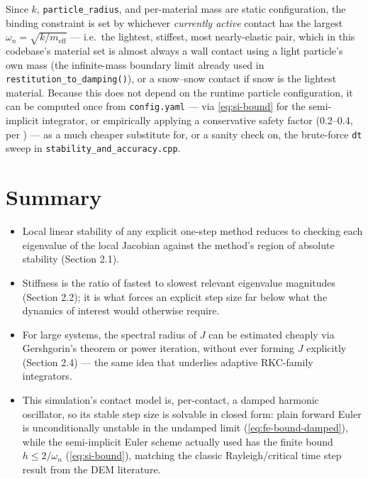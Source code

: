 \documentclass[11pt]{article}
\begin{document}
Since $k$, \texttt{particle\_radius}, and per-material mass are static configuration, the
binding constraint is set by whichever \emph{currently active} contact has the largest
$\omega_n = \sqrt{k/m_{\text{eff}}}$ — i.e.\ the lightest, stiffest, most nearly-elastic
pair, which in this codebase's material set is almost always a wall contact using a light
particle's own mass (the infinite-mass boundary limit already used in
\texttt{restitution\_to\_damping()}), or a snow--snow contact if snow is the lightest
material. Because this does not depend on the runtime particle configuration, it can be
computed once from \texttt{config.yaml} — via \eqref{eq:si-bound} for the semi-implicit
integrator, or empirically applying a conservative safety factor (0.2--0.4, per
\cite{osullivanbray2004}) — as a much cheaper substitute for, or a sanity check on, the
brute-force \texttt{dt} sweep in \texttt{stability\_and\_accuracy.cpp}.

\section{Summary}

\begin{itemize}
  \item Local linear stability of any explicit one-step method reduces to checking each
    eigenvalue of the local Jacobian against the method's region of absolute stability
    (Section 2.1).
  \item Stiffness is the ratio of fastest to slowest relevant eigenvalue magnitudes
    (Section 2.2); it is what forces an explicit step size far below what the dynamics of
    interest would otherwise require.
  \item For large systems, the spectral radius of $J$ can be estimated cheaply via
    Gershgorin's theorem or power iteration, without ever forming $J$ explicitly
    (Section 2.4) — the same idea that underlies adaptive RKC-family integrators.
  \item This simulation's contact model is, per-contact, a damped harmonic oscillator, so
    its stable step size is solvable in closed form: plain forward Euler is unconditionally
    unstable in the undamped limit (\eqref{eq:fe-bound-damped}), while the semi-implicit
    Euler scheme actually used has the finite bound $h \le 2/\omega_n$
    (\eqref{eq:si-bound}), matching the classic Rayleigh/critical time step result from the
    DEM literature.
\end{itemize}
\end{document}
